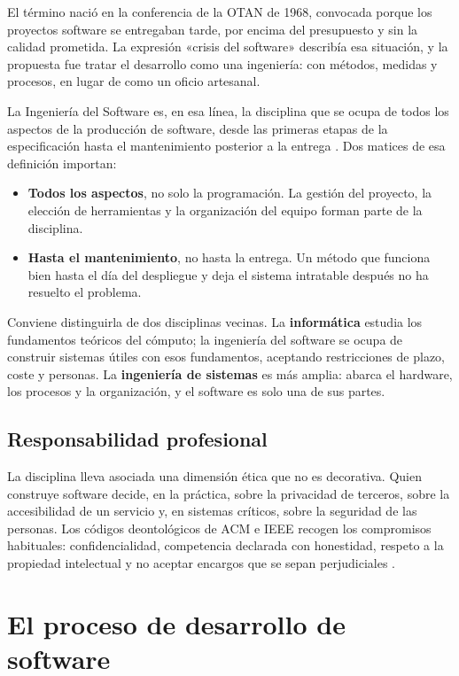 El término nació en la conferencia de la OTAN de 1968, convocada porque los
proyectos software se entregaban tarde, por encima del presupuesto y sin la
calidad prometida. La expresión «crisis del software» describía esa situación, y
la propuesta fue tratar el desarrollo como una ingeniería: con métodos, medidas y
procesos, en lugar de como un oficio artesanal.

La Ingeniería del Software es, en esa línea, la disciplina que se ocupa de todos
los aspectos de la producción de software, desde las primeras etapas de la
especificación hasta el mantenimiento posterior a la entrega
\cite{sommerville2016}. Dos matices de esa definición importan:

\begin{itemize}
    \item \textbf{Todos los aspectos}, no solo la programación. La gestión del
          proyecto, la elección de herramientas y la organización del equipo
          forman parte de la disciplina.
    \item \textbf{Hasta el mantenimiento}, no hasta la entrega. Un método que
          funciona bien hasta el día del despliegue y deja el sistema
          intratable después no ha resuelto el problema.
\end{itemize}

Conviene distinguirla de dos disciplinas vecinas. La \textbf{informática} estudia
los fundamentos teóricos del cómputo; la ingeniería del software se ocupa de
construir sistemas útiles con esos fundamentos, aceptando restricciones de plazo,
coste y personas. La \textbf{ingeniería de sistemas} es más amplia: abarca el
hardware, los procesos y la organización, y el software es solo una de sus
partes.

\subsection*{Responsabilidad profesional}

La disciplina lleva asociada una dimensión ética que no es decorativa. Quien
construye software decide, en la práctica, sobre la privacidad de terceros, sobre
la accesibilidad de un servicio y, en sistemas críticos, sobre la seguridad de
las personas. Los códigos deontológicos de ACM e IEEE recogen los compromisos
habituales: confidencialidad, competencia declarada con honestidad, respeto a la
propiedad intelectual y no aceptar encargos que se sepan perjudiciales
\cite{sommerville2016}.

\section{El proceso de desarrollo de software}

